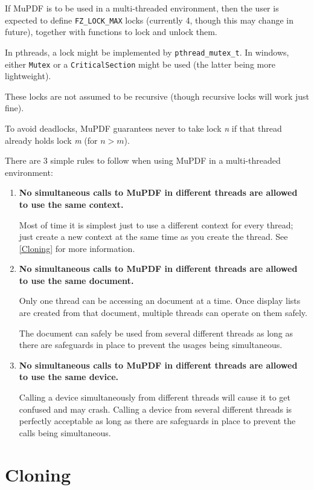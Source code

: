 \documentclass[oneside]{book}
\newcommand{\rjwref}[1] {\autoref{#1} \nameref{#1}}
\begin{document}
If MuPDF is to be used in a multi-threaded environment, then the user is expected to define \texttt{FZ\_LOCK\_MAX} locks (currently 4, though this may change in future), together with functions to lock and unlock them.

In pthreads, a lock might be implemented by \texttt{pthread\_mutex\_t}. In windows, either \texttt{Mutex} or a \texttt{CriticalSection} might be used (the latter being more lightweight).

These locks are not assumed to be recursive (though recursive locks will work just fine).

To avoid deadlocks, MuPDF guarantees never to take lock \textit{n} if that thread already holds lock \textit{m} (for $n > m$).

There are 3 simple rules to follow when using MuPDF in a multi-threaded environment:

\begin{enumerate}
\item \textbf{No simultaneous calls to MuPDF in different threads are allowed to use the same context.}

Most of time it is simplest just to use a different context for every thread; just create a new context at the same time as you create the thread. See \rjwref{Cloning} for more information.

\item \textbf{No simultaneous calls to MuPDF in different threads are allowed to use the same document.}

Only one thread can be accessing an document at a time. Once display lists are created from that document, multiple threads can operate on them safely.

The document can safely be used from several different threads as long as there are safeguards in place to prevent the usages being simultaneous.

\item \textbf{No simultaneous calls to MuPDF in different threads are allowed to use the same device.}

Calling a device simultaneously from different threads will cause it to get confused and may crash. Calling a device from several different threads is perfectly acceptable as long as there are safeguards in place to prevent the calls being simultaneous.

\end{enumerate}


\section{Cloning}
\label{Cloning}
\end{document}
